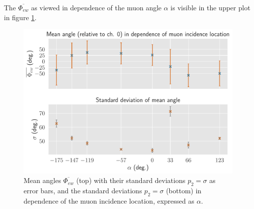


    
    The $\overline{\Phi_{ew}}$ as viewed in dependence of the muon angle $\alpha$ is visible in the upper plot in figure \ref{fig:phi-ew-alpha}.
    
    \begin{figure}[h!]
        \centering
        \includegraphics[width=\textwidth]{pictures/phi-ew-std-sep.pdf}
        \caption{Mean angles $\overline{\Phi_{ew}}$ (top) with their standard deviations $p_2 = \sigma$ as error bars, and the standard deviations $p_2 = \sigma$ (bottom) in dependence of the muon incidence location, expressed as $\alpha$.}
        \label{fig:phi-ew-alpha}
    \end{figure}
    
